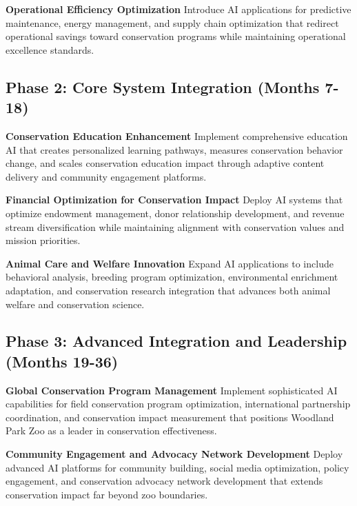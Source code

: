 \documentclass[
  Letterpaper,
]{scrbook}
\begin{document}
\textbf{Operational Efficiency Optimization} Introduce AI applications
for predictive maintenance, energy management, and supply chain
optimization that redirect operational savings toward conservation
programs while maintaining operational excellence standards.

\subsection*{Phase 2: Core System Integration (Months
7-18)}\label{phase-2-core-system-integration-months-7-18}

\textbf{Conservation Education Enhancement} Implement comprehensive
education AI that creates personalized learning pathways, measures
conservation behavior change, and scales conservation education impact
through adaptive content delivery and community engagement platforms.

\textbf{Financial Optimization for Conservation Impact} Deploy AI
systems that optimize endowment management, donor relationship
development, and revenue stream diversification while maintaining
alignment with conservation values and mission priorities.

\textbf{Animal Care and Welfare Innovation} Expand AI applications to
include behavioral analysis, breeding program optimization,
environmental enrichment adaptation, and conservation research
integration that advances both animal welfare and conservation science.

\subsection*{Phase 3: Advanced Integration and Leadership (Months
19-36)}\label{phase-3-advanced-integration-and-leadership-months-19-36}

\textbf{Global Conservation Program Management} Implement sophisticated
AI capabilities for field conservation program optimization,
international partnership coordination, and conservation impact
measurement that positions Woodland Park Zoo as a leader in conservation
effectiveness.

\textbf{Community Engagement and Advocacy Network Development} Deploy
advanced AI platforms for community building, social media optimization,
policy engagement, and conservation advocacy network development that
extends conservation impact far beyond zoo boundaries.
\end{document}
